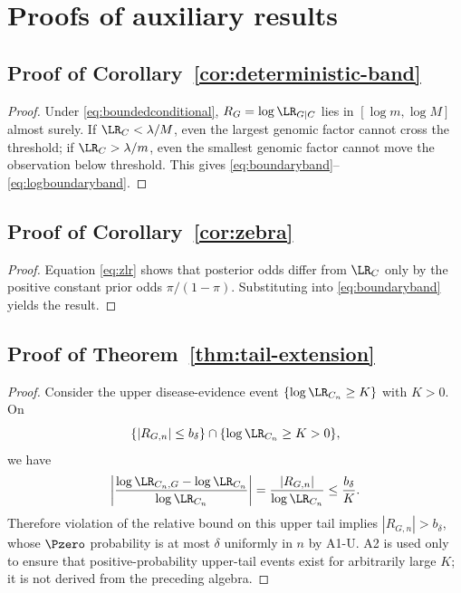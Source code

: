 \appendices
\section{Proofs of auxiliary results}
\label{app:proofs}

\subsection{Proof of Corollary~\ref{cor:deterministic-band}}
\begin{proof}
Under \eqref{eq:boundedconditional}, $R_G=\log \LR_{G\mid C}$ lies in $[\log m,\log M]$ almost surely. If $\LR_C<\lambda/M$, even the largest genomic factor cannot cross the threshold; if $\LR_C>\lambda/m$, even the smallest genomic factor cannot move the observation below threshold. This gives \eqref{eq:boundaryband}--\eqref{eq:logboundaryband}.
\end{proof}

\subsection{Proof of Corollary~\ref{cor:zebra}}
\begin{proof}
Equation \eqref{eq:zlr} shows that posterior odds differ from $\LR_C$ only by the positive constant prior odds $\pi/(1-\pi)$. Substituting into \eqref{eq:boundaryband} yields the result.
\end{proof}

\subsection{Proof of Theorem~\ref{thm:tail-extension}}
\begin{proof}
Consider the upper disease-evidence event $\{\log\LR_{C_n}\ge K\}$ with $K>0$. On
\begin{equation}
\{|R_{G,n}|\le b_\delta\}\cap\{\log\LR_{C_n}\ge K>0\},
\end{equation}
we have
\begin{equation}
\left|
\frac{\log\LR_{C_n,G}-\log\LR_{C_n}}
     {\log\LR_{C_n}}
\right|
=\frac{|R_{G,n}|}{\log\LR_{C_n}}
\le \frac{b_\delta}{K}.
\end{equation}
Therefore violation of the relative bound on this upper tail implies $|R_{G,n}|>b_\delta$, whose $\Pzero$ probability is at most $\delta$ uniformly in $n$ by A1-U. A2 is used only to ensure that positive-probability upper-tail events exist for arbitrarily large $K$; it is not derived from the preceding algebra.
\end{proof}

